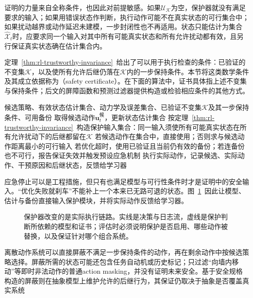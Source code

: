 证明的力量来自全称条件，也因此对前提敏感。如果$\mathcal U_{\mathcal K}$为空，保护器就没有满足要求的输入；如果用错误状态作判断，执行动作可能不在真实状态的可行集合中；如果扰动越界或动作延迟未建模，一步封闭性也不再适用。状态只能估计为集合$\widehat{\mathcal X}_t$时，应要求同一个输入对其中所有可能真实状态和所有允许扰动都有效，且另行保证真实状态确在估计集合内。

定理~\ref{thm:rl-trustworthy-invariance}~给出了可以用于执行检查的条件：已验证的不变集$\mathcal K$，以及使所有允许后继仍落在$\mathcal K$内的一步保持条件。本节将这类数学条件及其成立依据称为（safety certificate）。在下面的算法中，证书具体指上述不变集与保持条件；后文的屏障函数和预测过滤器提供构造或检验相应条件的其他方式。

\begin{algorithm}[带可行性检查的安全过滤]
  \label{alg:rl-trustworthy-filter}
  \begin{algorithmic}[1]
    \Require 候选策略、有效状态估计集合、动力学及误差集合、已验证不变集$\mathcal K$及其一步保持条件、可用备份
      \State 取得候选动作$\bm{u}^{\text{候}}_t$，更新状态估计集合
      \State 按定理~\ref{thm:rl-trustworthy-invariance}~构造保护输入集合：同一输入须使所有可能真实状态在所有允许扰动下的后继都留在$\mathcal K$
      \State 若候选动作在集合中，直接使用；否则求与候选动作距离最小的可行输入
      \State 若优化超时，使用已验证且当前仍有效的备份；若连备份也不可行，报告保证失效并触发预设应急机制
      \State 执行实际动作，记录候选、实际动作、干预原因和后继状态，反馈给学习器
    \EndFor
  \end{algorithmic}
\end{algorithm}

应急停止可以是工程措施，但只有也满足模型与可行性条件时才是证明中的安全输入。“优化失败就刹车”不能补上一个本来已无路可退的状态。图~\ref{fig:rl-trustworthy-filter}~因此让模型、估计与备份直接输入保护模块，并将实际动作反馈给学习器。

\begin{figure}[t]
  \centering
  
  \caption{保护器改变的是实际执行链路。实线是决策与日志流，虚线是保护判断所依赖的模型和证书；评估时必须说明保护是否启用、哪些动作被替换，以及保证针对哪个组合系统。}
  \label{fig:rl-trustworthy-filter}
\end{figure}

离散动作系统可以直接屏蔽不满足一步保持条件的动作，再在剩余动作中按候选策略选择。屏蔽所需的状态可能还包含任务自动机或历史标记；只过滤“向墙内移动”等即时非法动作的普通action masking，并没有证明未来安全。基于安全规格构造的屏蔽则在抽象模型上维护允许的后继行为，其保证仍取决于抽象是否覆盖真实系统

